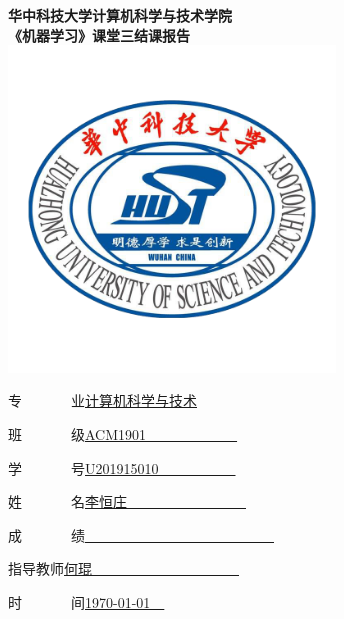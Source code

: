 \begin{titlepage}

\begin{center}


 

{\huge \bfseries 华中科技大学计算机科学与技术学院}\\[1.5cm]

{ \huge \bfseries 《机器学习》课堂三结课报告}\\[1.5cm]

\includegraphics[width=0.65\textwidth]{figure/logo1.png}\\[1.5cm]   






\begin{minipage}{0.5\textwidth}
\large
{\heiti 专~~~~~~~业}\quad \underline{计算机科学与技术}

{\heiti 班~~~~~~~级}\quad \underline{ACM1901~~~~~~~~~~~~~}

{\heiti 学~~~~~~~号}\quad \underline{U201915010~~~~~~~~~~~}

{\heiti 姓~~~~~~~名}\quad \underline{李恒庄~~~~~~~~~~~~~~~~~}

{\heiti 成~~~~~~~绩}\quad \underline{~~~~~~~~~~~~~~~~~~~~~~~~~~~}

{\heiti 指导教师}\quad \underline{何琨~~~~~~~~~~~~~~~~~~~~~}

{\heiti 时~~~~~~~间}\quad \underline{\today~~}
\end{minipage}

\vfill

\end{center}

\end{titlepage}
